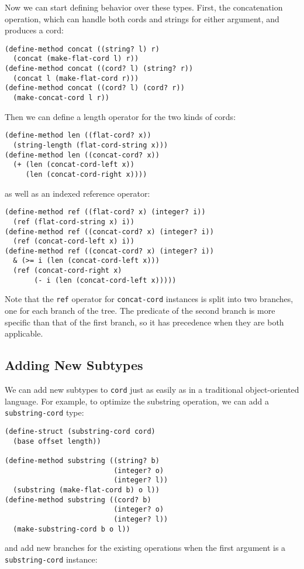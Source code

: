 \documentclass{acm_proc_article-sp}
\newcommand{\code}[1]{\texttt{#1}}
\begin{document}
Now we can start defining behavior over these types.  First, the
concatenation operation, which can handle both cords and strings for
either argument, and produces a cord:

\begin{verbatim}
(define-method concat ((string? l) r)
  (concat (make-flat-cord l) r))
(define-method concat ((cord? l) (string? r))
  (concat l (make-flat-cord r)))
(define-method concat ((cord? l) (cord? r))
  (make-concat-cord l r))
\end{verbatim}

Then we can define a length operator for the two kinds of cords:

\begin{verbatim}
(define-method len ((flat-cord? x))
  (string-length (flat-cord-string x)))
(define-method len ((concat-cord? x))
  (+ (len (concat-cord-left x))
     (len (concat-cord-right x))))
\end{verbatim}

as well as an indexed reference operator:

\begin{verbatim}
(define-method ref ((flat-cord? x) (integer? i))
  (ref (flat-cord-string x) i))
(define-method ref ((concat-cord? x) (integer? i))
  (ref (concat-cord-left x) i))
(define-method ref ((concat-cord? x) (integer? i))
  & (>= i (len (concat-cord-left x)))
  (ref (concat-cord-right x)
       (- i (len (concat-cord-left x)))))
\end{verbatim}

Note that the \code{ref} operator for \code{concat-cord} instances is
split into two branches, one for each branch of the tree.  The
predicate of the second branch is more specific than that of the first
branch, so it has precedence when they are both applicable.

\subsection{Adding New Subtypes}
\label{empty-cord}

We can add new subtypes to \code{cord} just as easily as in a
traditional object-oriented language.  For example, to optimize the
substring operation, we can add a \code{substring-cord} type:

\begin{verbatim}
(define-struct (substring-cord cord)
  (base offset length))

(define-method substring ((string? b)
                          (integer? o)
                          (integer? l))
  (substring (make-flat-cord b) o l))
(define-method substring ((cord? b)
                          (integer? o)
                          (integer? l))
  (make-substring-cord b o l))
\end{verbatim}
and add new branches for the existing operations when the first
argument is a \code{substring-cord} instance:
\end{document}
